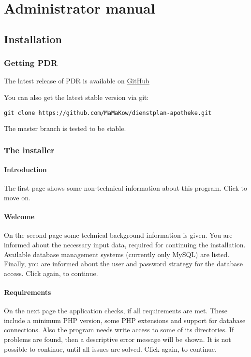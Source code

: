 \chapter{Administrator manual}

\section{Installation}\label{sec:installation}

\subsection{Getting PDR}
The latest release of PDR is available on \href{https://github.com/MaMaKow/dienstplan-apotheke/releases}{GitHub}

You can also get the latest stable version via git:
\begin{lstlisting}
git clone https://github.com/MaMaKow/dienstplan-apotheke.git
\end{lstlisting}
The master branch is tested to be stable.

\subsection{The installer}

\subsubsection{Introduction}
The first page shows some non-technical information about this program. Click  to move on.

\subsubsection{Welcome}
On the second page some technical background information is given. You are informed about the necessary input data, required for continuing the installation. Available database management systems (currently only MySQL) are listed. Finally, you are informed about the user and password strategy for the database access. Click  again, to continue.

\subsubsection{Requirements}
On the next page the application checks, if all requirements are met. These include a minimum PHP version, some PHP extensions and support for database connections. Also the program needs write access to some of its directories.
If problems are found, then a descriptive error message will be shown. It is not possible to continue, until all issues are solved.
Click  again, to continue.

